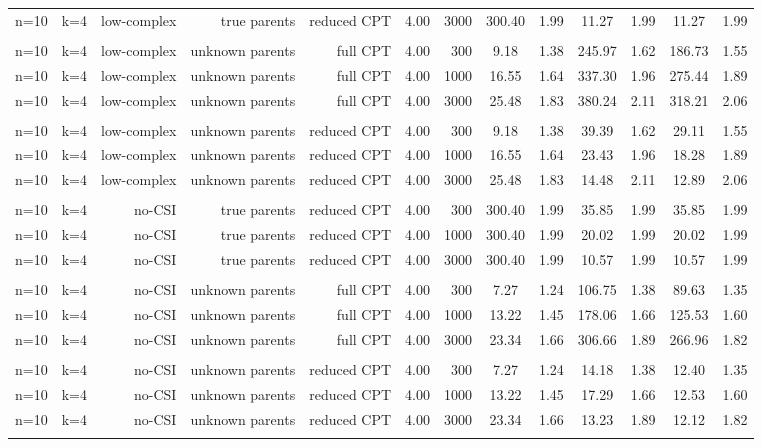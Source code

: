 \begin{table}[ht]
\begin{tabular}{rrrrrrr|cc|cc|cc}
  n=10 & k=4 & low-complex & true parents & reduced CPT & 4.00 & 3000 & 300.40 & 1.99 & 11.27 & 1.99 & 11.27 & 1.99 \\ 
   \\ 
n=10 & k=4 & low-complex & unknown parents & full CPT & 4.00 & 300 & 9.18 & 1.38 & 245.97 & 1.62 & 186.73 & 1.55 \\ 
  n=10 & k=4 & low-complex & unknown parents & full CPT & 4.00 & 1000 & 16.55 & 1.64 & 337.30 & 1.96 & 275.44 & 1.89 \\ 
  n=10 & k=4 & low-complex & unknown parents & full CPT & 4.00 & 3000 & 25.48 & 1.83 & 380.24 & 2.11 & 318.21 & 2.06 \\ 
   \\ 
n=10 & k=4 & low-complex & unknown parents & reduced CPT & 4.00 & 300 & 9.18 & 1.38 & 39.39 & 1.62 & 29.11 & 1.55 \\ 
  n=10 & k=4 & low-complex & unknown parents & reduced CPT & 4.00 & 1000 & 16.55 & 1.64 & 23.43 & 1.96 & 18.28 & 1.89 \\ 
  n=10 & k=4 & low-complex & unknown parents & reduced CPT & 4.00 & 3000 & 25.48 & 1.83 & 14.48 & 2.11 & 12.89 & 2.06 \\ 
   \\ 
n=10 & k=4 & no-CSI & true parents & reduced CPT & 4.00 & 300 & 300.40 & 1.99 & 35.85 & 1.99 & 35.85 & 1.99 \\ 
  n=10 & k=4 & no-CSI & true parents & reduced CPT & 4.00 & 1000 & 300.40 & 1.99 & 20.02 & 1.99 & 20.02 & 1.99 \\ 
  n=10 & k=4 & no-CSI & true parents & reduced CPT & 4.00 & 3000 & 300.40 & 1.99 & 10.57 & 1.99 & 10.57 & 1.99 \\ 
   \\ 
n=10 & k=4 & no-CSI & unknown parents & full CPT & 4.00 & 300 & 7.27 & 1.24 & 106.75 & 1.38 & 89.63 & 1.35 \\ 
  n=10 & k=4 & no-CSI & unknown parents & full CPT & 4.00 & 1000 & 13.22 & 1.45 & 178.06 & 1.66 & 125.53 & 1.60 \\ 
  n=10 & k=4 & no-CSI & unknown parents & full CPT & 4.00 & 3000 & 23.34 & 1.66 & 306.66 & 1.89 & 266.96 & 1.82 \\ 
   \\ 
n=10 & k=4 & no-CSI & unknown parents & reduced CPT & 4.00 & 300 & 7.27 & 1.24 & 14.18 & 1.38 & 12.40 & 1.35 \\ 
  n=10 & k=4 & no-CSI & unknown parents & reduced CPT & 4.00 & 1000 & 13.22 & 1.45 & 17.29 & 1.66 & 12.53 & 1.60 \\ 
  n=10 & k=4 & no-CSI & unknown parents & reduced CPT & 4.00 & 3000 & 23.34 & 1.66 & 13.23 & 1.89 & 12.12 & 1.82 \\ 
   \bottomrule 
 \multicolumn{13}{l}{\scriptsize } 
 \end{tabular}
\end{table}
